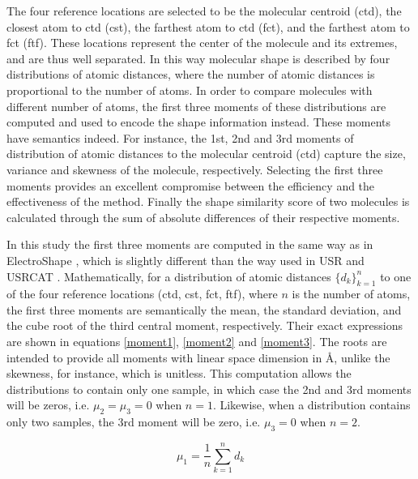 \documentclass[a4,center,fleqn]{NAR}
\begin{document}
The four reference locations are selected to be the molecular centroid (ctd), the closest atom to ctd (cst), the farthest atom to ctd (fct), and the farthest atom to fct (ftf). These locations represent the center of the molecule and its extremes, and are thus well separated. In this way molecular shape is described by four distributions of atomic distances, where the number of atomic distances is proportional to the number of atoms. In order to compare molecules with different number of atoms, the first three moments of these distributions are computed and used to encode the shape information instead. These moments have semantics indeed. For instance, the 1st, 2nd and 3rd moments of distribution of atomic distances to the molecular centroid (ctd) capture the size, variance and skewness of the molecule, respectively. Selecting the first three moments provides an excellent compromise between the efficiency and the effectiveness of the method. Finally the shape similarity score of two molecules is calculated through the sum of absolute differences of their respective moments.

In this study the first three moments are computed in the same way as in ElectroShape \cite{1337}, which is slightly different than the way used in USR \cite{1379,1332,1380} and USRCAT \cite{1331}. Mathematically, for a distribution of atomic distances $\{d_k\}_{k=1}^n$ to one of the four reference locations (ctd, cst, fct, ftf), where $n$ is the number of atoms, the first three moments are semantically the mean, the standard deviation, and the cube root of the third central moment, respectively. Their exact expressions are shown in equations \eqref{moment1}, \eqref{moment2} and \eqref{moment3}. The roots are intended to provide all moments with linear space dimension in \AA, unlike the skewness, for instance, which is unitless. This computation allows the distributions to contain only one sample, in which case the 2nd and 3rd moments will be zeros, i.e. $\mu_2=\mu_3=0$ when $n=1$. Likewise, when a distribution contains only two samples, the 3rd moment will be zero, i.e. $\mu_3=0$ when $n=2$.


\begin{equation}
\mu_1=\frac{1}{n}\sum_{k=1}^{n}{d_k}
\label{moment1}
\end{equation}
\end{document}

